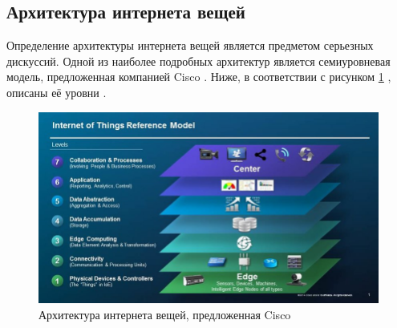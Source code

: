 


\subsection{Архитектура интернета вещей} 

Определение архитектуры интернета вещей является предметом серьезных дискуссий. 
Одной из наиболее подробных архитектур является семиуровневая модель, предложенная компанией Cisco \cite{Cisco}. Ниже, в соответствии с рисунком \ref{fig:architecture} \cite{Cisco_architecture_img}, описаны её уровни \cite{Cisco_architecture_big} \cite{Cisco_architecture_small}.

\begin{figure}[h]
	\centering
	\includegraphics[width=\textwidth ]{img/Illustration-of-the-IoT-Reference-Model-by-Cisco-1.png}
	\caption{Архитектура интернета вещей, предложенная Cisco}
	\label{fig:architecture}
\end{figure} 

